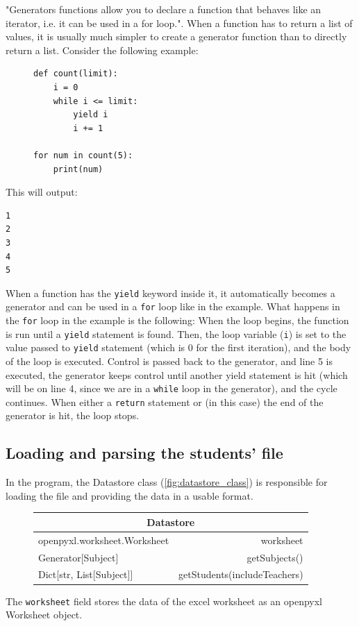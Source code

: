 \documentclass[12pt]{article}
\newcommand{\code}[1]{\texttt{\color{Grey}#1}}
\begin{document}
"Generators functions allow you to declare a function that behaves like an iterator, i.e. it
can be used in a for loop."\autocite{generators}. When a function has to return a list of
values, it is usually much simpler to create a generator function than to directly return a
list. Consider the following example: \vspace{-6mm}
%
\begin{figure}[H]
    \caption{}\vspace{-6mm}
\begin{verbatim}
def count(limit):
    i = 0
    while i <= limit:
        yield i
        i += 1

for num in count(5):
    print(num)
\end{verbatim}
\end{figure}
%
This will output:\vspace{-5mm}
%
\begin{verbatim}
1
2
3
4
5
\end{verbatim}
%
When a function has the \code{yield} keyword inside it, it automatically becomes a
generator and can be used in a \code{for} loop like in the example. What happens in the
\code{for} loop in the example is the following: When the loop begins, the function is run
until a \code{yield} statement is found. Then, the loop variable (\code{i}) is set to
the value passed to \code{yield} statement (which is 0 for the first iteration), and the
body of the loop is executed. Control is passed back to the generator, and line 5 is
executed, the generator keeps control until another yield statement is hit (which will be on
line 4, since we are in a \code{while} loop in the generator), and the cycle continues.
When either a \code{return} statement or (in this case) the end of the generator is hit,
the loop stops.

\subsection{Loading and parsing the students' file}


In the program, the Datastore class (\autoref{fig:datastore_class}) is responsible for loading
the file and providing the data in a usable format.
%
\begin{figure}[H]
    \caption{}
    \label{fig:datastore_class}
    \centering
    \def\arraystretch{1.5}
    \begin{tabular}{|l r|}
        \hline
        \multicolumn{2}{|c|}{Datastore}\\
        \hline
        \hline
        openpyxl.worksheet.Worksheet &worksheet\\
        \hline
        Generator[Subject] &getSubjects()\\
        Dict[str, List[Subject]] &getStudents(includeTeachers)\\
        \hline
    \end{tabular}
    \label{table:datastore}
\end{figure}
%
The \code{worksheet} field stores the data of the excel worksheet as an openpyxl Worksheet
object. 
\end{document}
